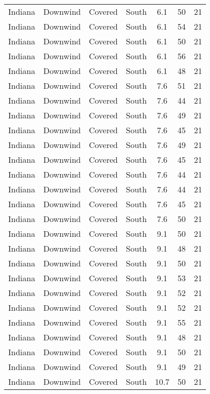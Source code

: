\documentclass{article}
\begin{document}
\begin{longtable}[H]{ccccccc}
Indiana & Downwind & Covered     & South  & 6.1  & 50 & 21 \\
Indiana & Downwind & Covered     & South  & 6.1  & 54 & 21 \\
Indiana & Downwind & Covered     & South  & 6.1  & 50 & 21 \\
Indiana & Downwind & Covered     & South  & 6.1  & 56 & 21 \\
Indiana & Downwind & Covered     & South  & 6.1  & 48 & 21 \\
Indiana & Downwind & Covered     & South  & 7.6  & 51 & 21 \\
Indiana & Downwind & Covered     & South  & 7.6  & 44 & 21 \\
Indiana & Downwind & Covered     & South  & 7.6  & 49 & 21 \\
Indiana & Downwind & Covered     & South  & 7.6  & 45 & 21 \\
Indiana & Downwind & Covered     & South  & 7.6  & 49 & 21 \\
Indiana & Downwind & Covered     & South  & 7.6  & 45 & 21 \\
Indiana & Downwind & Covered     & South  & 7.6  & 44 & 21 \\
Indiana & Downwind & Covered     & South  & 7.6  & 44 & 21 \\
Indiana & Downwind & Covered     & South  & 7.6  & 45 & 21 \\
Indiana & Downwind & Covered     & South  & 7.6  & 50 & 21 \\
Indiana & Downwind & Covered     & South  & 9.1  & 50 & 21 \\
Indiana & Downwind & Covered     & South  & 9.1  & 48 & 21 \\
Indiana & Downwind & Covered     & South  & 9.1  & 50 & 21 \\
Indiana & Downwind & Covered     & South  & 9.1  & 53 & 21 \\
Indiana & Downwind & Covered     & South  & 9.1  & 52 & 21 \\
Indiana & Downwind & Covered     & South  & 9.1  & 52 & 21 \\
Indiana & Downwind & Covered     & South  & 9.1  & 55 & 21 \\
Indiana & Downwind & Covered     & South  & 9.1  & 48 & 21 \\
Indiana & Downwind & Covered     & South  & 9.1  & 50 & 21 \\
Indiana & Downwind & Covered     & South  & 9.1  & 49 & 21 \\
Indiana & Downwind & Covered     & South  & 10.7 & 50 & 21 \\

\end{longtable}
\end{document}
